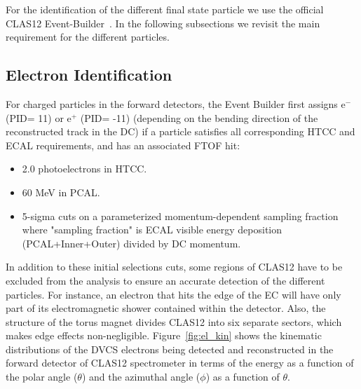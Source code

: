 For the identification of the different final state particle we use the 
official CLAS12 Event-Builder~\cite{eventbuilder}. In the following subsections 
we revisit the main requirement for the different particles. 

\subsection{Electron Identification} 
For charged particles in the forward detectors, the Event Builder first assigns 
e$^-$ (PID= 11) or e$^+$ (PID= -11) (depending on the bending direction of the 
reconstructed track in the DC) if a particle satisfies all corresponding HTCC 
and ECAL requirements, and has an associated FTOF hit:
\begin{itemize}
 \item 2.0 photoelectrons in HTCC.
 \item 60 MeV in PCAL.
 \item  5-sigma cuts on a parameterized momentum-dependent sampling fraction 
    where "sampling fraction" is ECAL visible energy deposition 
      (PCAL+Inner+Outer) divided by DC momentum.  
      
\end{itemize}

In addition to these initial selections cuts, some regions of CLAS12 have to be 
excluded from the analysis to ensure an accurate detection of the different 
particles. For instance, an electron that hits the edge of the EC will have 
only part of its electromagnetic shower contained within the detector. Also, 
the structure of the torus magnet divides CLAS12 into six separate sectors, 
which makes edge effects non-negligible. Figure~\ref{fig:el_kin} shows the 
kinematic distributions of the DVCS electrons being detected and reconstructed 
in the forward detector of CLAS12 spectrometer in terms of the energy as a 
function of the polar angle ($\theta$) and the azimuthal angle ($\phi$) as a 
function of $\theta$. 

